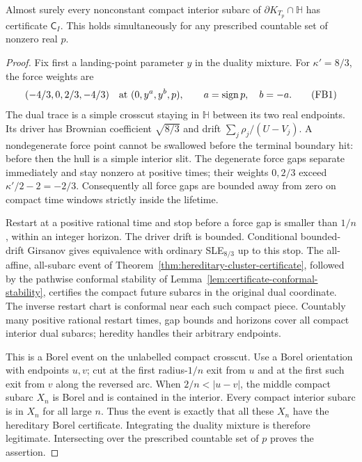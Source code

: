 \begin{lemma}
\label{lem:swallow-frontier-certified}
Almost surely every nonconstant compact interior subarc of
$\partial K_{T_p}\cap\mathbb H$ has certificate $\mathsf C_I$.
This holds simultaneously for any prescribed countable set of
nonzero real $p$.
\end{lemma}
\begin{proof}
Fix first a landing-point parameter $y$ in the duality mixture.
For $\kappa'=8/3$, the force weights are
\[
 (-4/3,0,2/3,-4/3)
 \quad\hbox{at }(0,y^a,y^b,p),\qquad
 a=\operatorname{sign}p,\quad b=-a.
 \tag{FB1}
\]
The dual trace is a simple crosscut staying in $\mathbb H$ between
its two real endpoints. Its driver has Brownian coefficient
$\sqrt{8/3}$ and drift $\sum_j\rho_j/(U-V_j)$.
A nondegenerate force point cannot be swallowed before the terminal
boundary hit: before then the hull is a simple interior slit.
The degenerate force gaps separate immediately and stay nonzero at
positive times; their weights $0,2/3$ exceed
$\kappa'/2-2=-2/3$. Consequently all force gaps are bounded away
from zero on compact time windows strictly inside the lifetime.

Restart at a positive rational time and stop before a force gap is
smaller than $1/n$, within an integer horizon. The driver drift is
bounded. Conditional bounded-drift Girsanov gives equivalence with
ordinary SLE$_{8/3}$ up to this stop. The all-affine, all-subarc
event of Theorem~\ref{thm:hereditary-cluster-certificate}, followed
by the pathwise conformal stability of
Lemma~\ref{lem:certificate-conformal-stability}, certifies the compact
future subarcs in the original dual coordinate. The inverse restart
chart is conformal near each such compact piece. Countably many
positive rational restart times, gap bounds and horizons cover all
compact interior dual subarcs; heredity handles their arbitrary
endpoints.

This is a Borel event on the unlabelled compact crosscut. Use a Borel
orientation with endpoints $u,v$; cut at the first radius-$1/n$
exit from $u$ and at the first such exit from $v$ along the reversed
arc. When $2/n<|u-v|$, the middle compact subarc $X_n$ is Borel
and is contained in the interior. Every compact interior subarc is
in $X_n$ for all large $n$. Thus the event is exactly that all these
$X_n$ have the hereditary Borel certificate. Integrating the
duality mixture is therefore legitimate. Intersecting over the
prescribed countable set of $p$ proves the assertion.
\end{proof}

